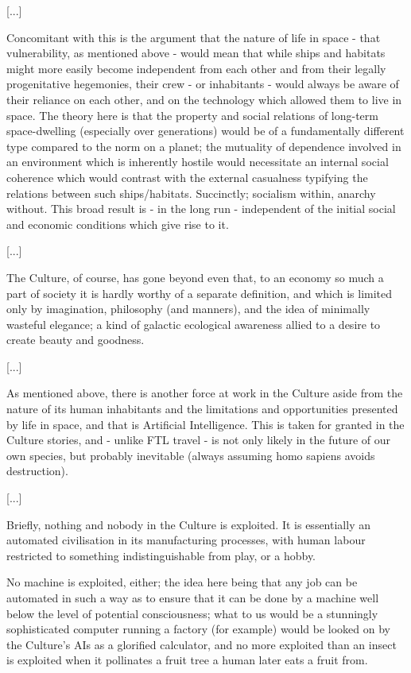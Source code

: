 \documentclass[10pt,a4paper]{article}
\begin{document}
[...]

Concomitant with this is the argument that the nature of life in space - that vulnerability, as mentioned above - would mean that while ships and habitats might more easily become independent from each other and from their legally progenitative hegemonies, their crew - or inhabitants - would always be aware of their reliance on each other, and on the technology which allowed them to live in space. The theory here is that the property and social relations of long-term space-dwelling (especially over generations) would be of a fundamentally different type compared to the norm on a planet; the mutuality of dependence involved in an environment which is inherently hostile would necessitate an internal social coherence which would contrast with the external casualness typifying the relations between such ships/habitats. Succinctly; socialism within, anarchy without. This broad result is - in the long run - independent of the initial social and economic conditions which give rise to it.

[...]

The Culture, of course, has gone beyond even that, to an economy so much a part of society it is hardly worthy of a separate definition, and which is limited only by imagination, philosophy (and manners), and the idea of minimally wasteful elegance; a kind of galactic ecological awareness allied to a desire to create beauty and goodness.

[...]

As mentioned above, there is another force at work in the Culture aside from the nature of its human inhabitants and the limitations and opportunities presented by life in space, and that is Artificial Intelligence. This is taken for granted in the Culture stories, and - unlike FTL travel - is not only likely in the future of our own species, but probably inevitable (always assuming homo sapiens avoids destruction).

[...]

Briefly, nothing and nobody in the Culture is exploited. It is essentially an automated civilisation in its manufacturing processes, with human labour restricted to something indistinguishable from play, or a hobby.

No machine is exploited, either; the idea here being that any job can be automated in such a way as to ensure that it can be done by a machine well below the level of potential consciousness; what to us would be a stunningly sophisticated computer running a factory (for example) would be looked on by the Culture's AIs as a glorified calculator, and no more exploited than an insect is exploited when it pollinates a fruit tree a human later eats a fruit from.
\end{document}
